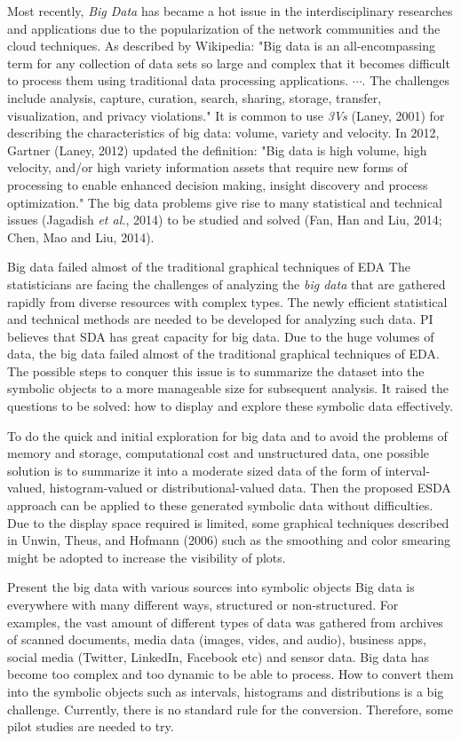 \documentclass[article]{jss}
\begin{document}
Most recently, {\it Big Data} has became a hot issue in the
interdisciplinary researches and applications due to the
popularization of the network communities and the cloud techniques. As
described by Wikipedia: "Big data is an all-encompassing term for any
collection of data sets so large and complex that it becomes difficult
to process them using traditional data processing applications.
$\cdots$. The challenges include analysis, capture, curation, search,
sharing, storage, transfer, visualization, and privacy violations." It
is common to use {\it 3Vs} (Laney, 2001) for describing the
characteristics of big data: volume, variety and velocity. In 2012,
Gartner (Laney, 2012) updated the definition: "Big data is high
volume, high velocity, and/or high variety information assets that
require new forms of processing to enable enhanced decision making,
insight discovery and process optimization." The big data problems
give rise to many statistical and technical issues (Jagadish {\it et
al.}, 2014) to be studied and solved (Fan, Han and Liu, 2014; Chen,
Mao and Liu, 2014).

Big data failed almost of the traditional graphical techniques of EDA
The statisticians are facing the challenges of analyzing the {\it big
data} that are gathered rapidly from diverse resources with complex
types. The newly efficient statistical and technical methods are
needed to be developed for analyzing such data. PI believes that SDA
has great capacity for big data. Due to the huge volumes of data, the
big data failed almost of the traditional graphical techniques of EDA.
The possible steps to conquer this issue is to summarize the dataset
into the symbolic objects to a more manageable size for subsequent
analysis. It raised the questions to be solved: how to display and
explore these symbolic data effectively.

To do the quick and initial exploration for big data and to avoid the
problems of memory and storage, computational cost and unstructured
data, one possible solution is to summarize it into a moderate sized
data of the form of interval-valued, histogram-valued or
distributional-valued data. Then the proposed ESDA approach can be
applied to these generated symbolic data without difficulties. Due to
the display space required is limited, some graphical techniques
described in Unwin, Theus, and Hofmann (2006) such as the smoothing
and color smearing might be adopted to increase the visibility of
plots.

Present the big data with various sources into symbolic objects Big
data is everywhere with many different ways, structured or
non-structured. For examples, the vast amount of different types of
data was gathered from archives of scanned documents, media data
(images, vides, and audio), business apps, social media (Twitter,
LinkedIn, Facebook etc) and sensor data. Big data has become too
complex and too dynamic to be able to process. How to convert them
into the symbolic objects such as intervals, histograms and
distributions is a big challenge. Currently, there is no standard rule
for the conversion. Therefore, some pilot studies are needed to try.
\end{document}
